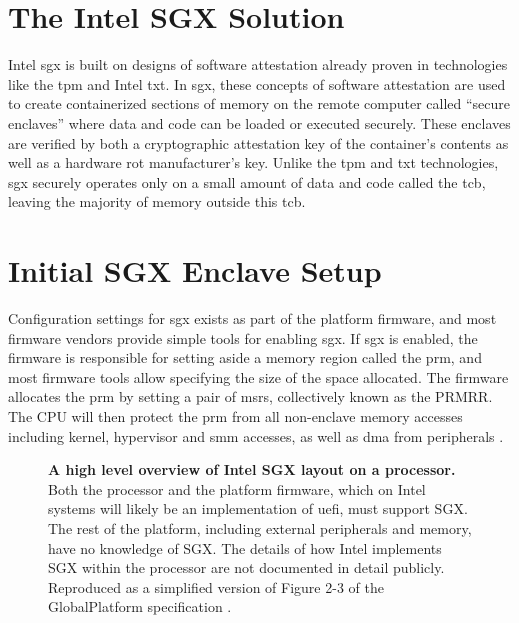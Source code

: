 \section{The Intel SGX Solution}
Intel \gls{sgx} is built on designs of software attestation already proven in technologies like the \gls{tpm} and Intel \gls{txt}. In \gls{sgx}, these concepts of software \gls{attestation} are used to create containerized sections of memory on the remote computer called ``secure enclaves'' where data and code can be loaded or executed securely. These enclaves are verified by both a cryptographic \gls{attestation} key of the container’s contents as well as a hardware \gls{rot} manufacturer’s key. Unlike the \gls{tpm} and \gls{txt} technologies, \gls{sgx} securely operates only on a small amount of data and code called the \gls{tcb}, leaving the majority of memory outside this \gls{tcb}.
\section{Initial SGX Enclave Setup}
Configuration settings for \gls{sgx} exists as part of the platform firmware, and most firmware vendors provide simple tools for enabling \gls{sgx}. If \gls{sgx} is enabled, the firmware is responsible for setting aside a memory region called the \gls{prm}, and most firmware tools allow specifying the size of the space allocated. The firmware allocates the \gls{prm} by setting a pair of \glspl{msr}, collectively known as the PRMRR. The CPU will then protect the \gls{prm} from all non-enclave memory accesses including kernel, hypervisor and \gls{smm} accesses, as well as \gls{dma} from peripherals \cite{Costan2016}.

\begin{figure}[hb]
\centering

\caption[High Level SGX Overview]{\textbf{A high level overview of Intel SGX layout on a processor.} Both the processor and the platform firmware, which on Intel systems will likely be an implementation of \gls{uefi}, must support SGX. The rest of the platform, including external peripherals and memory, have no knowledge of SGX. The details of how Intel implements SGX within the processor are not documented in detail publicly. Reproduced as a simplified version of Figure 2-3 of the GlobalPlatform specification \cite{GlobalPlatform2018}.}
\label{fig:sgx-hl}
\end{figure}

